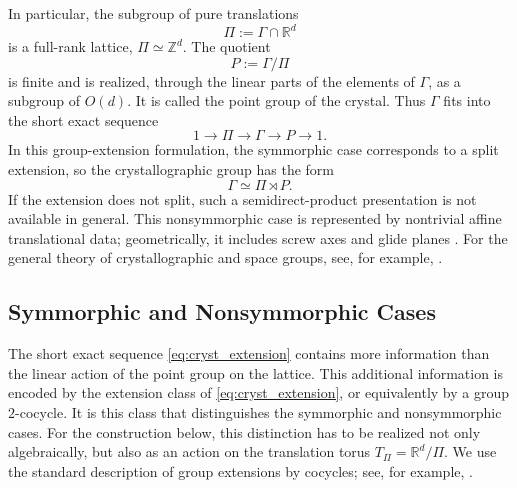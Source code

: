 \documentclass[11pt]{amsart}
\theoremstyle{plain}
\theoremstyle{definition}
\theoremstyle{remark}
\begin{document}
In particular, the subgroup of pure translations
\begin{equation}
	\Pi:=\Gamma\cap \mathbb{R}^d
	\label{eq:lattice_def}
\end{equation}
is a full-rank lattice, \(\Pi\simeq \mathbb{Z}^d\). 
The quotient
\begin{equation}
	P:=\Gamma/\Pi
	\label{eq:point_group_def}
\end{equation}
is finite and is realized, through the linear parts of the elements of \(\Gamma\), as a subgroup of \(O(d)\). 
It is called the point group of the crystal. 
Thus \(\Gamma\) fits into the short exact sequence
\begin{equation}
	1\longrightarrow \Pi \longrightarrow \Gamma \longrightarrow P \longrightarrow 1.
	\label{eq:cryst_extension}
\end{equation}
In this group-extension formulation, the symmorphic case corresponds to a split extension, so the crystallographic group has the form
\[
\Gamma \simeq \Pi \rtimes P.
\]
If the extension does not split, such a semidirect-product presentation is not available in general. 
This nonsymmorphic case is represented by nontrivial affine translational data; geometrically, it includes screw axes and glide planes \cite{BradleyCracknell,InternationalTablesA}. 
For the general theory of crystallographic and space groups, see, for example, \cite{Charlap1986,BradleyCracknell,InternationalTablesA}.

\subsection{Symmorphic and Nonsymmorphic Cases}
\label{subsec:symmorphic_nonsymmorphic_affine}

The short exact sequence \eqref{eq:cryst_extension} contains more information than the linear action of the point group on the lattice. 
This additional information is encoded by the extension class of \eqref{eq:cryst_extension}, or equivalently by a group \(2\)-cocycle. 
It is this class that distinguishes the symmorphic and nonsymmorphic cases. 
For the construction below, this distinction has to be realized not only algebraically, but also as an action on the translation torus \(T_\Pi=\mathbb R^d/\Pi\). 
We use the standard description of group extensions by cocycles; see, for example, \cite{Charlap1986,BrownCohomology}.
\end{document}
